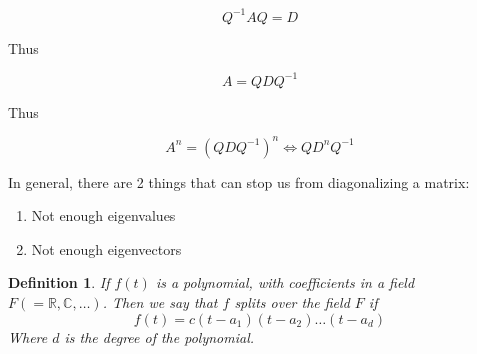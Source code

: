 \documentclass{article}
\newtheorem{definition}[theorem]{Definition}
\newtheorem{one minute paper}[theorem]{One Minute Paper}
\begin{document}
\begin{equation}
    Q^{-1}AQ = D
\end{equation}

Thus

\begin{equation}
    A = QDQ^{-1}
\end{equation}

Thus 

\begin{equation}
    A^n = (QDQ^{-1})^n \iff QD^nQ^{-1}
\end{equation}

In general, there are 2 things that can stop us from diagonalizing a matrix:
\begin{enumerate}
    \item Not enough eigenvalues 
    \item Not enough eigenvectors 
\end{enumerate}

\begin{definition}
    If $f(t)$ is a polynomial, with coefficients in a field $F (= \mathbb{R}, \mathbb{C}, \dots)$. Then we say that $f$ splits over the field $F$ if 
    \begin{equation}
        f(t) = c(t - a_1)(t-a_2)\dots(t-a_d)
    \end{equation} 
    Where $d$ is the degree of the polynomial. 
\end{definition}
\end{document}
